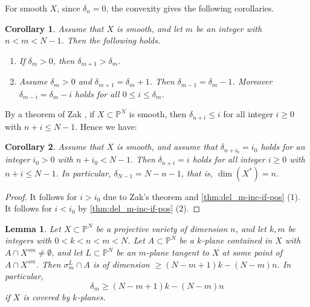 \documentclass[a4paper,12pt]{amsart}
\theoremstyle{plain}
\newtheorem{cor}[cor]{Corollary}
\newtheorem{lem}[lem]{Lemma}
\theoremstyle{definition}
\begin{document}
For smooth $X$,
since $\delta_n = 0$,
the convexity 
gives the following corollaries.

\begin{cor}\label{thm:del_m-inc-if-pos}\label{thm:decrease-1}
  Assume that $X$ is smooth,
  and let $m$ be an integer with $n < m < N-1$.
  Then the following holds.
  \begin{enumerate}
  \item 
    If $\delta_m > 0$,
    then $\delta_{m+1} > \delta_m$.
  \item 
    Assume $\delta_{m} > 0$ and $\delta_{m+1} = \delta_{m} + 1$.
    Then $\delta_{m-1} = \delta_{m} - 1$.
    Moreover $\delta_{m-i} = \delta_{m} - i$ holds for all $0 {\leqslant} i {\leqslant} \delta_{m}$.
  \end{enumerate}
\end{cor}

By a theorem of Zak \cite[I, 2.3 Theorem]{Zak},
if $X \subset {{\mathbb{P}}^N}$ is smooth, then $\delta_{n+i} {\leqslant} i$ for
all integer $i {\geqslant} 0$ with $n+i {\leqslant} N-1$. Hence we have:

\begin{cor}\label{thm:eq-Zaks-formula}
  Assume that $X$ is smooth,
  and assume that $\delta_{n+{i_0}} = i_0$ holds for an integer $i_0 > 0$ with $n+i_0 < N-1$.
  Then $\delta_{n+i} = i$ holds for all integer $i {\geqslant} 0$ with $n+i {\leqslant} N-1$.
  In particular, $\delta_{N-1} = N-n-1$, that is, $\dim(X^*) = n$.
\end{cor}
\begin{proof}
  It follows for $i > i_0$ due to Zak's theorem
  and \autoref{thm:del_m-inc-if-pos} (1).
  It follows for $i < i_0$ by
  \autoref{thm:del_m-inc-if-pos} (2).
\end{proof}

\begin{lem}\label{thm:del-geq-kn}
  Let $X \subset {{\mathbb{P}}^N}$ be a projective variety of dimension $n$,
  and let $k,m$ be integers with $0 < k < n < m < N$.
  Let $A \subset {{\mathbb{P}}^N}$ be a $k$-plane contained in $X$ with $A \cap X^{sm} \neq \emptyset$,
  and let $L \subset {{\mathbb{P}}^N}$ be an $m$-plane
  tangent to $X$ at some point of $A \cap X^{sm} $.
  Then $\sigma_m^L \cap A$ is of dimension ${\geqslant} (N-m+1)k - (N-m)n$.
  In particular,
  \[
  \delta_m {\geqslant} (N-m+1)k - (N-m)n
  \]
  if $X$ is covered by $k$-planes.
\end{lem}
\end{document}
